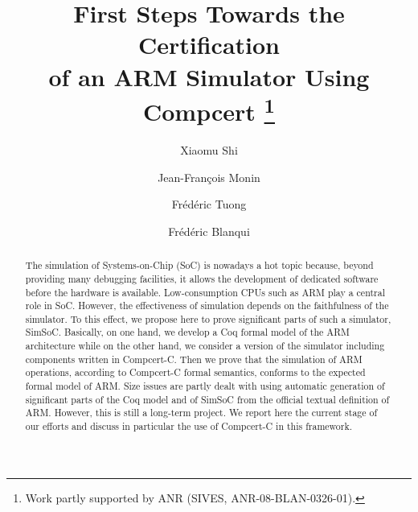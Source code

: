 \documentclass{llncs}
\begin{document}
\title{First Steps Towards the Certification \\ of an ARM Simulator
Using Compcert
\thanks{Work partly supported by ANR (SIVES, ANR-08-BLAN-0326-01).}
}
\author{Xiaomu Shi
\and Jean-Fran\c{c}ois Monin
\and Fr\'ed\'eric Tuong
\and Fr\'ed\'eric Blanqui
}

\maketitle

\begin{abstract}
The simulation of Systems-on-Chip (SoC) is nowadays a hot topic
because, beyond providing many debugging facilities,
it allows the development of dedicated software before
the hardware is available.
Low-consumption CPUs such as ARM play a central role in SoC.
However, the effectiveness of simulation depends on the faithfulness
of the simulator. 
To this effect, we propose here to prove significant parts of
such a simulator, SimSoC.
Basically, on one hand, we develop a Coq formal model of the ARM 
architecture while on the other hand, we consider a
version of the simulator including components written in Compcert-C.
Then we prove that the simulation of ARM operations, 
according to Compcert-C formal semantics, 
conforms to the expected formal model of ARM.
Size issues are partly dealt with using automatic generation 
of significant parts of the Coq model and of SimSoC from
the official textual definition of ARM.
However, this is still a long-term project. 
We report here the current stage of our efforts
and discuss in particular the use of Compcert-C
in this framework.
\end{abstract}













\end{document}
